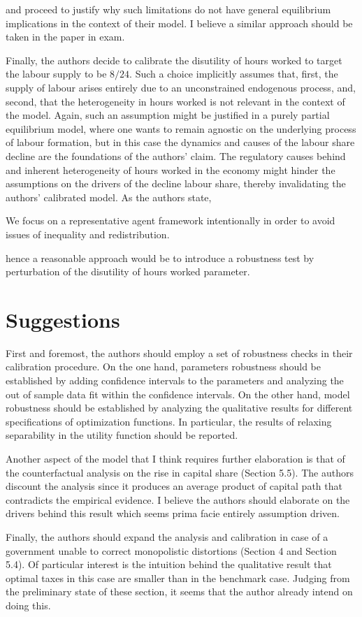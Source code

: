 \documentclass[american]{scrartcl}
\begin{document}
and proceed to justify why such limitations do not have general equilibrium implications in the context of their model. I believe a similar approach should be taken in the paper in exam.

Finally, the authors decide to calibrate the disutility of hours worked to target the labour supply to be $8/24$. Such a choice implicitly assumes that, first, the supply of labour arises entirely due to an unconstrained endogenous process, and, second, that the heterogeneity in hours worked is not relevant in the context of the model. Again, such an assumption might be justified in a purely partial equilibrium model, where one wants to remain agnostic on the underlying process of labour formation, but in this case the dynamics and causes of the labour share decline are the foundations of the authors' claim. The regulatory causes behind and inherent heterogeneity of hours worked in the economy might hinder the assumptions on the drivers of the decline labour share, thereby invalidating the authors' calibrated model. As the authors state,

\begin{displayquote}[p. 3][]
    We focus on a representative agent framework intentionally in order to avoid issues of inequality and redistribution.
\end{displayquote}

hence a reasonable approach would be to introduce a robustness test by perturbation of the disutility of hours worked parameter.

\section{Suggestions}

First and foremost, the authors should employ a set of robustness checks in their calibration procedure. On the one hand, parameters robustness should be established by adding confidence intervals to the parameters and analyzing the out of sample data fit within the confidence intervals. On the other hand, model robustness should be established by analyzing the qualitative results for different specifications of optimization functions. In particular, the results of relaxing separability in the utility function should be reported.

Another aspect of the model that I think requires further elaboration is that of the counterfactual analysis on the rise in capital share (Section 5.5). The authors discount the analysis since it produces an average product of capital path that contradicts the empirical evidence. I believe the authors should elaborate on the drivers behind this result which seems prima facie entirely assumption driven.

Finally, the authors should expand the analysis and calibration in case of a government unable to correct monopolistic distortions (Section 4 and Section 5.4). Of particular interest is the intuition behind the qualitative result that optimal taxes in this case are smaller than in the benchmark case. Judging from the preliminary state of these section, it seems that the author already intend on doing this.

\newpage
\nocite{*}
\printbibliography
\end{document}
